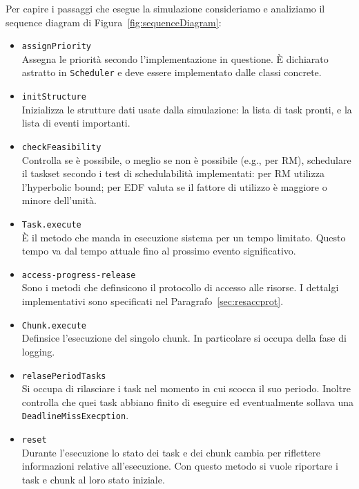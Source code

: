Per capire i passaggi che esegue la simulazione consideriamo e analiziamo il sequence diagram di Figura~\ref{fig:sequenceDiagram}:
\begin{itemize}
    \item \texttt{assignPriority} \\
        Assegna le priorità secondo l'implementazione in questione. È dichiarato astratto in \texttt{Scheduler} e deve essere implementato dalle classi concrete.
    \item \texttt{initStructure} \\
        Inizializza le strutture dati usate dalla simulazione: la lista di task pronti, e la lista di eventi importanti.
    \item \texttt{checkFeasibility} \\
        Controlla se è possibile, o meglio se non è possibile (e.g., per RM), schedulare il taskset secondo i test di schedulabilità implementati: per RM utilizza l'hyperbolic bound; per EDF valuta se il fattore di utilizzo è maggiore o minore dell'unità.
    \item \texttt{Task.execute} \\
        È il metodo che manda in esecuzione sistema per un tempo limitato. Questo tempo va dal tempo attuale fino al prossimo evento significativo.
    \item \texttt{access-progress-release} \\
        Sono i metodi che definsicono il protocollo di accesso alle risorse. I dettalgi implementativi sono specificati nel Paragrafo~\ref{sec:resaccprot}.
    \item \texttt{Chunk.execute} \\
        Definsice l'esecuzione del singolo chunk. In particolare si occupa della fase di logging.
    \item \texttt{relasePeriodTasks} \\
        Si occupa di rilasciare i task nel momento in cui scocca il suo periodo. Inoltre controlla che quei task abbiano finito di eseguire ed eventualmente sollava una \texttt{DeadlineMissExecption}.
    \item \texttt{reset} \\
        Durante l'esecuzione lo stato dei task e dei chunk cambia per riflettere informazioni relative all'esecuzione. Con questo metodo si vuole riportare i task e chunk al loro stato iniziale.
\end{itemize}

